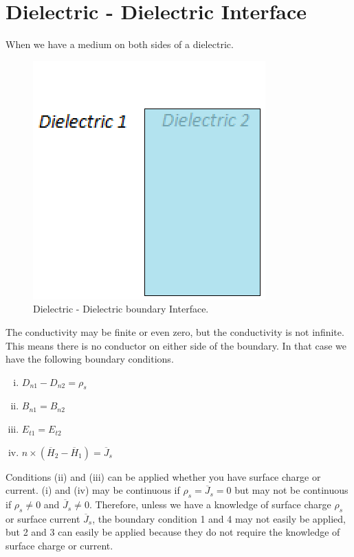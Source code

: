 \section{Dielectric - Dielectric Interface}
When we have a medium on both sides of a dielectric.
\begin{figure}[h]
\centering
\includegraphics[width=.6\linewidth]{./graphics/diemedium5}
\caption{Dielectric - Dielectric boundary Interface.}
\end{figure}

The conductivity may be finite or even zero, but the conductivity is not infinite. This means there is no conductor on either side of the boundary. In that case we have the following boundary conditions.
\begin{enumerate}[(i)]
\item $D_{n1} - D_{n2} = \rho_s$
\item $B_{n1} = B_{n2}$
\item $E_{t1} = E_{t2}$
\item $\hat{n} \times (\overline{H}_2 - \overline{H}_1) = \overline{J}_s$
\end{enumerate}

Conditions (ii) and (iii) can be applied whether you have surface charge or current. (i) and (iv) may be continuous if $\rho_s = \overline{J}_s = 0$ but may not be continuous if $\rho_s\neq 0$ and $\overline{J}_s\neq 0$.
Therefore, unless we have a knowledge of surface charge $\rho_s$ or surface current $\overline{J}_s$, the boundary condition 1 and 4 may not easily be applied, but 2 and 3 can easily be applied because they do not require the knowledge of surface charge or current.

